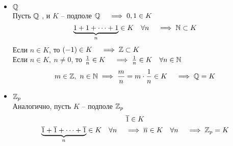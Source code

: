 \begin{eproof}
	\item
	\begin{itemize}
		\item $ \mathbb{Q} $ \\
		Пусть $ \mathbb{Q} $ , и $ K $ -- подполе $ \mathbb{Q} \quad \implies 0, 1 \in K $
		$$ \underbrace{1 + 1 + \dots + 1}_n \in K \quad \forall n \quad \implies \mathbb{N} \subset K $$
		Если $ n \in K $, то $ (-1) \in K \quad \implies \mathbb{Z} \subset K $ \\
		Если $ n \in K, ~ n \ne 0 $, то $ \frac1n \in K \quad \implies \frac1n \in K \quad \forall n \in \mathbb{N} $
		$$ m \in \mathbb{Z}, ~ n \in \mathbb{N} \implies \frac mn = m \cdot \frac1n \in K \quad \implies \mathbb{Q} = K $$
		\item $ \mathbb{Z}_p $ \\
		Аналогично, пусть $ K $ -- подполе $ \mathbb{Z}_p $
		$$ \overline1 \in K $$
		$$ \underbrace{\overline1 + \overline1 + \dots + \overline1}_n \in K \quad \forall n \quad \implies \overline n \in K \quad \forall n \quad \implies \mathbb{Z}_p = K $$
	\end{itemize}


\end{eproof}
